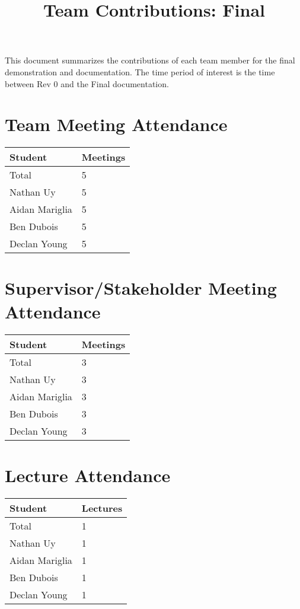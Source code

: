 \documentclass{article}
\title{Team Contributions: Final\\\progname}
\author{\authname}
\date{}
\begin{document}
\maketitle

This document summarizes the contributions of each team member for the final
demonstration and documentation.  The time period of interest is the time
between Rev 0 and the Final documentation.

\section{Team Meeting Attendance}

\begin{table}[H]
\centering
\begin{tabular}{ll}
\toprule
\textbf{Student} & \textbf{Meetings}\\
\midrule
Total & 5\\
Nathan Uy & 5\\
Aidan Mariglia & 5\\
Ben Dubois & 5\\
Declan Young & 5\\
\bottomrule
\end{tabular}
\end{table}

\section{Supervisor/Stakeholder Meeting Attendance}

\begin{table}[H]
\centering
\begin{tabular}{ll}
\toprule
\textbf{Student} & \textbf{Meetings}\\
\midrule
Total & 3\\
Nathan Uy & 3\\
Aidan Mariglia & 3\\
Ben Dubois & 3\\
Declan Young & 3\\
\bottomrule
\end{tabular}
\end{table}

\section{Lecture Attendance}

\begin{table}[H]
\centering
\begin{tabular}{ll}
\toprule
\textbf{Student} & \textbf{Lectures}\\
\midrule
Total & 1\\
Nathan Uy & 1\\
Aidan Mariglia & 1\\
Ben Dubois & 1\\
Declan Young & 1\\
\bottomrule
\end{tabular}
\end{table}
\end{document}
